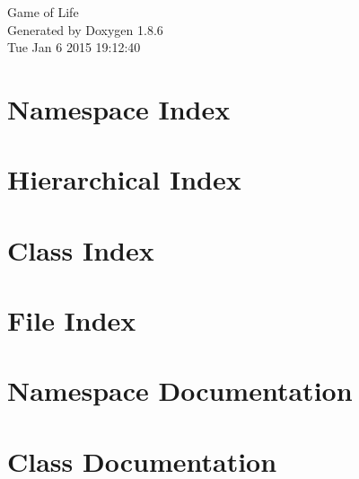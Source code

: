 \documentclass[twoside]{book}
\newcommand{\clearemptydoublepage}{%
  \newpage{\pagestyle{empty}\cleardoublepage}%
}
\begin{document}
\hypersetup{pageanchor=false}
\begin{titlepage}
\vspace*{7cm}
\begin{center}%
{\Large Game of Life }\\
\vspace*{1cm}
{\large Generated by Doxygen 1.8.6}\\
\vspace*{0.5cm}
{\small Tue Jan 6 2015 19:12:40}\\
\end{center}
\end{titlepage}
\clearemptydoublepage
\tableofcontents
\clearemptydoublepage
{}
\hypersetup{pageanchor=true}

\chapter{Namespace Index}

\chapter{Hierarchical Index}

\chapter{Class Index}

\chapter{File Index}

\chapter{Namespace Documentation}








\chapter{Class Documentation}













\end{document}
